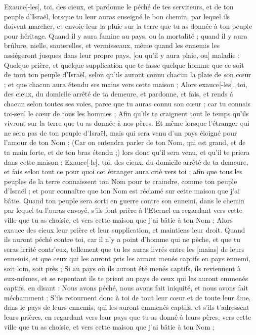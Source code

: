 \begin{multicols}{2}
Exauce[-les], toi, des cieux, et pardonne le péché de tes serviteurs, et de ton peuple d'Israël, lorsque tu leur auras enseigné le bon chemin, par lequel ils doivent marcher, et envoie-leur la pluie sur la terre que tu as donnée à ton peuple pour héritage.
Quand il y aura famine au pays, ou la mortalité ; quand il y aura brûlure, nielle, sauterelles, et vermisseaux, même quand les ennemis les assiégeront jusques dans leur propre pays, [ou qu'il y aura plaie, ou] maladie ;
Quelque prière, et quelque supplication que te fasse quelque homme que ce soit de tout ton peuple d'Israël, selon qu'ils auront connu chacun la plaie de son cœur ; et que chacun aura étendu ses mains vers cette maison ;
Alors exauce[-les], toi, des cieux, du domicile arrêté de ta demeure, et pardonne, et fais, et rends à chacun selon toutes ses voies, parce que tu auras connu son cœur ; car tu connais toi-seul le cœur de tous les hommes ;
Afin qu'ils te craignent tout le temps qu'ils vivront sur la terre que tu as donnée à nos pères.
Et même lorsque l'étranger qui ne sera pas de ton peuple d'Israël, mais qui sera venu d'un pays éloigné pour l'amour de ton Nom ;
(Car on entendra parler de ton Nom, qui est grand, et de ta main forte, et de ton bras étendu ;) lors donc qu'il sera venu, et qu'il te priera dans cette maison ;
Exauce[-le], toi, des cieux, du domicile arrêté de ta demeure, et fais selon tout ce pour quoi cet étranger aura crié vers toi ; afin que tous les peuples de la terre connaissent ton Nom pour te craindre, comme ton peuple d'Israël ; et pour connaître que ton Nom est réclamé sur cette maison que j'ai bâtie.
Quand ton peuple sera sorti en guerre contre son ennemi, dans le chemin par lequel tu l'auras envoyé, s'ils font prière à l'Eternel en regardant vers cette ville que tu as choisie, et vers cette maison que j'ai bâtie à ton Nom ;
Alors exauce des cieux leur prière et leur supplication, et maintiens leur droit.
Quand ils auront péché contre toi, car il n'y a point d'homme qui ne pèche, et que tu seras irrité contr'eux, tellement que tu les auras livrés entre les [mains] de leurs ennemis, et que ceux qui les auront pris les auront menés captifs en pays ennemi, soit loin, soit près ;
Si au pays où ils auront été menés captifs, ils reviennent à eux-mêmes, et se repentant ils te prient au pays de ceux qui les auront emmenés captifs, en disant : Nous avons péché, nous avons fait iniquité, et nous avons fait méchamment ;
S'ils retournent donc à toi de tout leur cœur et de toute leur âme, dans le pays de leurs ennemis, qui les auront emmenés captifs, et s'ils t'adressent leurs prières, en regardant vers leur pays que tu as donné à leurs pères, vers cette ville que tu as choisie, et vers cette maison que j'ai bâtie à ton Nom ;

\end{multicols}
